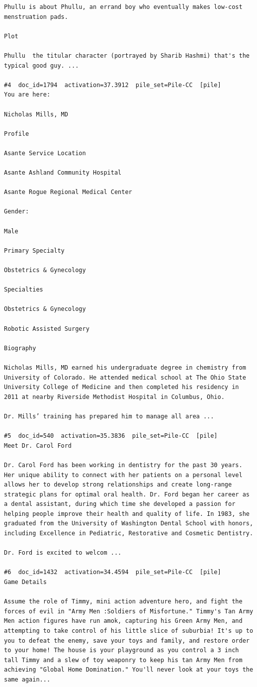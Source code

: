 \begin{verbatim}
Phullu is about Phullu, an errand boy who eventually makes low-cost menstruation pads.

Plot

Phullu  the titular character (portrayed by Sharib Hashmi) that's the typical good guy. ...

#4  doc_id=1794  activation=37.3912  pile_set=Pile-CC  [pile]
You are here:

Nicholas Mills, MD

Profile

Asante Service Location

Asante Ashland Community Hospital

Asante Rogue Regional Medical Center

Gender:

Male

Primary Specialty

Obstetrics & Gynecology

Specialties

Obstetrics & Gynecology

Robotic Assisted Surgery

Biography

Nicholas Mills, MD earned his undergraduate degree in chemistry from University of Colorado. He attended medical school at The Ohio State University College of Medicine and then completed his residency in 2011 at nearby Riverside Methodist Hospital in Columbus, Ohio.

Dr. Mills’ training has prepared him to manage all area ...

#5  doc_id=540  activation=35.3836  pile_set=Pile-CC  [pile]
Meet Dr. Carol Ford

Dr. Carol Ford has been working in dentistry for the past 30 years. Her unique ability to connect with her patients on a personal level allows her to develop strong relationships and create long-range strategic plans for optimal oral health. Dr. Ford began her career as a dental assistant, during which time she developed a passion for helping people improve their health and quality of life. In 1983, she graduated from the University of Washington Dental School with honors, including Excellence in Pediatric, Restorative and Cosmetic Dentistry.

Dr. Ford is excited to welcom ...

#6  doc_id=1432  activation=34.4594  pile_set=Pile-CC  [pile]
Game Details

Assume the role of Timmy, mini action adventure hero, and fight the forces of evil in "Army Men :Soldiers of Misfortune." Timmy's Tan Army Men action figures have run amok, capturing his Green Army Men, and attempting to take control of his little slice of suburbia! It's up to you to defeat the enemy, save your toys and family, and restore order to your home! The house is your playground as you control a 3 inch tall Timmy and a slew of toy weaponry to keep his tan Army Men from achieving "Global Home Domination." You'll never look at your toys the same again...


\end{verbatim}

